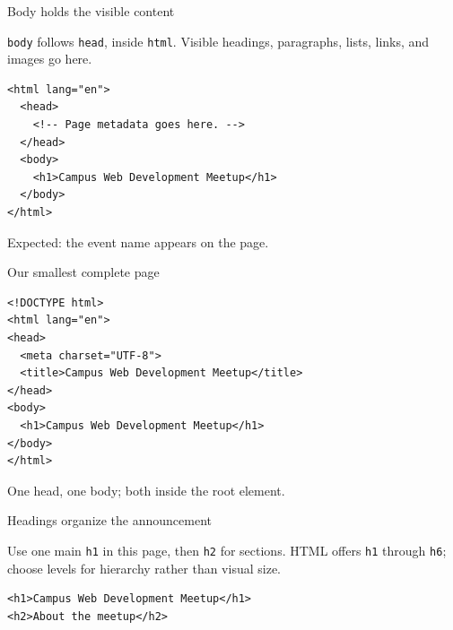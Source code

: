 \documentclass[aspectratio=169,12pt]{beamer}
\begin{document}
\begin{frame}[fragile]{Body holds the visible content}
\begin{conceptblock}
\texttt{body} follows \texttt{head}, inside \texttt{html}. Visible headings, paragraphs, lists, links, and images go here.
\end{conceptblock}
\begin{lstlisting}
<html lang="en">
  <head>
    <!-- Page metadata goes here. -->
  </head>
  <body>
    <h1>Campus Web Development Meetup</h1>
  </body>
</html>
\end{lstlisting}

\small Expected: the event name appears on the page.
\end{frame}

\begin{frame}[fragile]{Our smallest complete page}
\begin{lstlisting}[basicstyle=\ttfamily\small]
<!DOCTYPE html>
<html lang="en">
<head>
  <meta charset="UTF-8">
  <title>Campus Web Development Meetup</title>
</head>
<body>
  <h1>Campus Web Development Meetup</h1>
</body>
</html>
\end{lstlisting}
\small One head, one body; both inside the root element.
\end{frame}

\begin{frame}[fragile]{Headings organize the announcement}
\begin{conceptblock}
Use one main \texttt{h1} in this page, then \texttt{h2} for sections. HTML offers \texttt{h1} through \texttt{h6}; choose levels for hierarchy rather than visual size.
\end{conceptblock}
\begin{lstlisting}
<h1>Campus Web Development Meetup</h1>
<h2>About the meetup</h2>
\end{lstlisting}

\end{frame}
\end{document}
